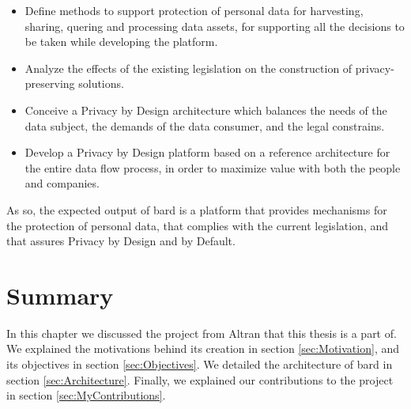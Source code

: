 \begin{itemize}
	
	\item Define methods to support protection of personal data for harvesting, sharing, quering and processing data assets, for supporting all the decisions to be taken while developing the platform.
	\item Analyze the effects of the existing legislation on the construction of privacy-preserving solutions.
	\item Conceive a Privacy by Design architecture which balances the needs of the data subject, the demands of the data consumer, and the legal constrains.
	\item Develop a Privacy by Design platform based on a reference architecture for the entire data flow process, in order to maximize value with both the people and companies.
\end{itemize}

As so, the expected output of \ac{bard} is a platform that provides mechanisms for the protection of personal data, that complies with the current legislation, and that assures Privacy by Design and by Default.





  
\section{Summary}
\label{sec:SummaryBARD}

In this chapter we discussed the project from Altran that this thesis is a part of.
We explained the motivations behind its creation in section \ref{sec:Motivation}, and its objectives in section \ref{sec:Objectives}.
We detailed the architecture of \ac{bard} in section \ref{sec:Architecture}.
Finally, we explained our contributions to the project in section \ref{sec:MyContributions}.


